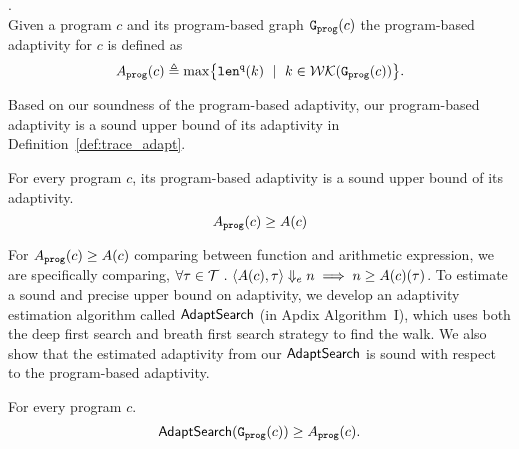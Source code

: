 {%
%
%
\begin{defn}
.
\label{def:prog_adapt}
\\
{
Given a program ${c}$ and its program-based graph 
$\mathtt{{G_{prog}}}({c})$
%
the program-based adaptivity for $c$ is 
defined as%
\[
\progA({c})
\triangleq \max
\left\{ \qlen(k) \ \mid \  k \in \walks(\progG(c))\right \}.
\]
}
\end{defn}
Based on our soundness of the program-based adaptivity, our program-based adaptivity is a sound upper bound of its adaptivity in Definition~\ref{def:trace_adapt}. 
\begin{thm}
  \label{thm:sound_progadapt}
  For every program $c$, 
  its program-based adaptivity is a sound upper bound of its adaptivity.
    $$  A_{\mathtt{prog}}(c) \geq A(c)$$
\end{thm}
For $A_{\mathtt{prog}}(c) \geq A(c)$ comparing between function and arithmetic expression,
we are specifically comparing, $\forall \mathtt{\tau} \in \mathcal{T} ~.~  
\langle A(c), \mathtt{\tau} \rangle \Downarrow_e n \implies n \geq A(c)(\mathtt{\tau}) $.
To estimate a sound and precise upper bound on adaptivity, we develop an adaptivity estimation algorithm called $\mathsf{AdaptSearch}$ (in Apdix Algorithm~I), which uses both the deep first search and breath first search strategy to find the walk. We also show that the estimated adaptivity from our $\mathsf{AdaptSearch}$ is sound with respect to the program-based adaptivity. 
\begin{thm}
  \label{thm:sound_adaptalg}
  For every program $c$.
    $$\mathsf{AdaptSearch}(\mathtt{{G_{prog}}}({c})) \geq A_{\mathtt{prog}}(c).$$
\end{thm}
}
